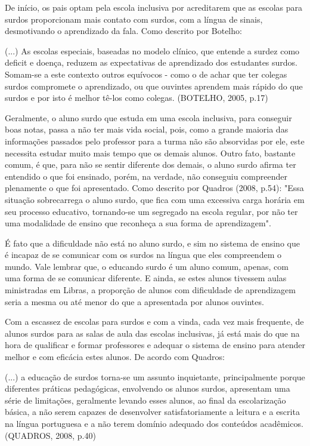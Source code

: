 \documentclass[brasil]{abnt}
\begin{document}
	De início, os pais optam pela escola inclusiva por acreditarem que as escolas para surdos proporcionam mais contato com surdos, com a língua de sinais, desmotivando o
	aprendizado da fala. Como descrito por Botelho:
	
		\begin{citacao}(...) As escolas especiais, baseadas no modelo clínico, que entende a surdez como deficit e doença, reduzem as expectativas de aprendizado dos 
						estudantes surdos. Somam-se a este contexto outros equívocos - como o de achar que ter colegas surdos compromete o aprendizado, ou que ouvintes 
						aprendem mais rápido do que surdos e por isto é melhor tê-los como colegas. (BOTELHO, 2005, p.17)
		\end{citacao}
	
	Geralmente, o aluno surdo que estuda em uma escola inclusiva, para conseguir boas notas, passa a não ter mais vida social, pois, como a grande maioria das informações passados pelo professor para a turma não são absorvidas por ele, este necessita estudar
	muito mais tempo que os demais alunos.
	Outro fato, bastante comum, é
	que, para não se sentir diferente dos demais, o aluno surdo afirma ter entendido o que foi ensinado, porém, na verdade, não conseguiu compreender plenamente o que foi apresentado.
	Como descrito por Quadros (2008, p.54): "Essa situação sobrecarrega o aluno surdo, que fica com uma excessiva carga horária em seu processo educativo, tornando-se um segregado na 
	escola regular, por não ter uma modalidade de ensino que reconheça a sua forma de aprendizagem". 
	
	É fato que a dificuldade não está no aluno surdo, e sim no sistema de ensino que é incapaz de se comunicar com os surdos na língua que eles compreendem o mundo. Vale lembrar que, 
	o educando surdo é um aluno comum, apenas, com uma forma de se comunicar diferente. E ainda, se estes alunos tivessem aulas ministradas em Libras, a proporção de alunos com dificuldade 
	de aprendizagem seria a mesma ou até menor do que a apresentada por alunos ouvintes.
	
	Com a escassez de escolas para surdos e com a vinda, cada vez mais frequente, de alunos surdos para as salas de aula das escolas inclusivas, já está mais do que na hora de 
	qualificar e formar professores e adequar o sistema de ensino para atender melhor e com eficácia estes alunos. De acordo com Quadros:
	
		\begin{citacao}(...) a educação de surdos torna-se um assunto inquietante, principalmente porque diferentes práticas pedagógicas, envolvendo os alunos surdos, apresentam
						uma série de limitações, geralmente levando esses alunos, ao final da escolarização básica, a não serem capazes de desenvolver satisfatoriamente a leitura 
						e a escrita na língua portuguesa e a não terem domínio adequado dos conteúdos acadêmicos. (QUADROS, 2008, p.40)
		\end{citacao}
	
\end{document}
